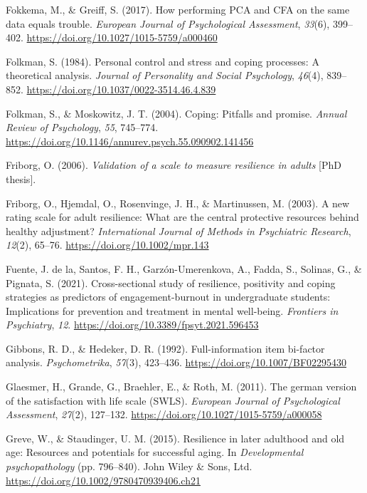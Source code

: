\documentclass[
  man,floatsintext]{apa7}
\newlength{\cslhangindent}
\newenvironment{CSLReferences}[2] %
 {\begin{list}{}{%
  \setlength{\itemindent}{0pt}
  \setlength{\leftmargin}{0pt}
  \setlength{\parsep}{0pt}
  \ifodd #1
   \setlength{\leftmargin}{\cslhangindent}
   \setlength{\itemindent}{-1\cslhangindent}
  \fi
  \setlength{\itemsep}{#2\baselineskip}}}
 {\end{list}}
\begin{document}
\begin{CSLReferences}{1}{0}
Fokkema, M., \& Greiff, S. (2017). How performing PCA and CFA on the same data equals trouble. \emph{European Journal of Psychological Assessment}, \emph{33}(6), 399--402. \url{https://doi.org/10.1027/1015-5759/a000460}

Folkman, S. (1984). Personal control and stress and coping processes: {A} theoretical analysis. \emph{Journal of Personality and Social Psychology}, \emph{46}(4), 839--852. \url{https://doi.org/10.1037/0022-3514.46.4.839}

Folkman, S., \& Moskowitz, J. T. (2004). Coping: Pitfalls and promise. \emph{Annual Review of Psychology}, \emph{55}, 745--774. \url{https://doi.org/10.1146/annurev.psych.55.090902.141456}

Friborg, O. (2006). \emph{Validation of a scale to measure resilience in adults} {[}PhD thesis{]}.

Friborg, O., Hjemdal, O., Rosenvinge, J. H., \& Martinussen, M. (2003). A new rating scale for adult resilience: What are the central protective resources behind healthy adjustment? \emph{International Journal of Methods in Psychiatric Research}, \emph{12}(2), 65--76. \url{https://doi.org/10.1002/mpr.143}

Fuente, J. de la, Santos, F. H., Garzón-Umerenkova, A., Fadda, S., Solinas, G., \& Pignata, S. (2021). Cross-sectional study of resilience, positivity and coping strategies as predictors of engagement-burnout in undergraduate students: Implications for prevention and treatment in mental well-being. \emph{Frontiers in Psychiatry}, \emph{12}. \url{https://doi.org/10.3389/fpsyt.2021.596453}

Gibbons, R. D., \& Hedeker, D. R. (1992). Full-information item bi-factor analysis. \emph{Psychometrika}, \emph{57}(3), 423--436. \url{https://doi.org/10.1007/BF02295430}

Glaesmer, H., Grande, G., Braehler, E., \& Roth, M. (2011). The german version of the satisfaction with life scale (SWLS). \emph{European Journal of Psychological Assessment}, \emph{27}(2), 127--132. \url{https://doi.org/10.1027/1015-5759/a000058}

Greve, W., \& Staudinger, U. M. (2015). Resilience in later adulthood and old age: Resources and potentials for successful aging. In \emph{Developmental psychopathology} (pp. 796--840). John Wiley \& Sons, Ltd. \url{https://doi.org/10.1002/9780470939406.ch21}


\end{CSLReferences}
\end{document}
